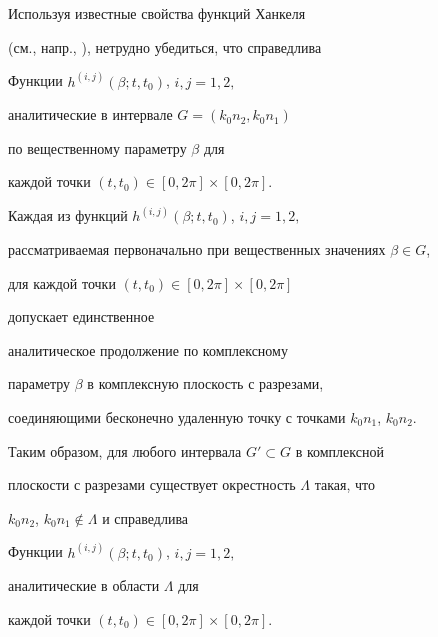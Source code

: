Используя известные свойства функций Ханкеля 


(см., напр., \cite{199603040011}), нетрудно убедиться, что справедлива 





\begin{lem}


\label{ker-G}


Функции $h^{(i,j)}(\beta;t,t_0)$, $i,j=1,2,$ 


аналитические в интервале $G=(k_0n_2, k_0n_1)$


по вещественному параметру $\beta$ для 


каждой точки $(t,t_0)\in [0,2\pi]\times [0,2\pi]$.


\end{lem}





Каждая из функций $h^{(i,j)}(\beta;t,t_0)$, $i,j=1,2,$ 


рассматриваемая первоначально при вещественных значениях $\beta \in G$,


для каждой точки $(t,t_0)\in [0,2\pi]\times [0,2\pi]$


допускает единственное 


аналитическое продолжение по комплексному 


параметру $\beta$ в комплексную плоскость с разрезами,


соединяющими бесконечно удаленную точку с точками $k_0n_1$, $k_0n_2$.


Таким образом, для любого интервала $G'\subset G$ в комплексной


плоскости с разрезами существует окрестность $\Lambda$ такая, что 


$k_0n_2$, $k_0n_1 \notin \Lambda$ и справедлива 





\begin{lem}


\label{ker-Gamma}


Функции $h^{(i,j)}(\beta;t,t_0)$, $i,j=1,2,$ 


аналитические в области $\Lambda$ для 


каждой точки $(t,t_0)\in [0,2\pi]\times [0,2\pi]$.


\end{lem}





